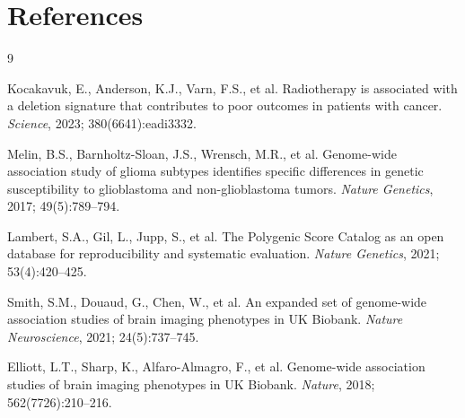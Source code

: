 \documentclass[11pt,a4paper]{article}
\begin{document}
\section*{References}

\begin{thebibliography}{9}

Kocakavuk, E., Anderson, K.J., Varn, F.S., et al.
Radiotherapy is associated with a deletion signature that contributes to poor outcomes in patients with cancer.
\textit{Science}, 2023; 380(6641):eadi3332.

Melin, B.S., Barnholtz-Sloan, J.S., Wrensch, M.R., et al.
Genome-wide association study of glioma subtypes identifies specific differences in genetic susceptibility to glioblastoma and non-glioblastoma tumors.
\textit{Nature Genetics}, 2017; 49(5):789--794.

Lambert, S.A., Gil, L., Jupp, S., et al.
The Polygenic Score Catalog as an open database for reproducibility and systematic evaluation.
\textit{Nature Genetics}, 2021; 53(4):420--425.

Smith, S.M., Douaud, G., Chen, W., et al.
An expanded set of genome-wide association studies of brain imaging phenotypes in UK Biobank.
\textit{Nature Neuroscience}, 2021; 24(5):737--745.

Elliott, L.T., Sharp, K., Alfaro-Almagro, F., et al.
Genome-wide association studies of brain imaging phenotypes in UK Biobank.
\textit{Nature}, 2018; 562(7726):210--216.

\end{thebibliography}
\end{document}

